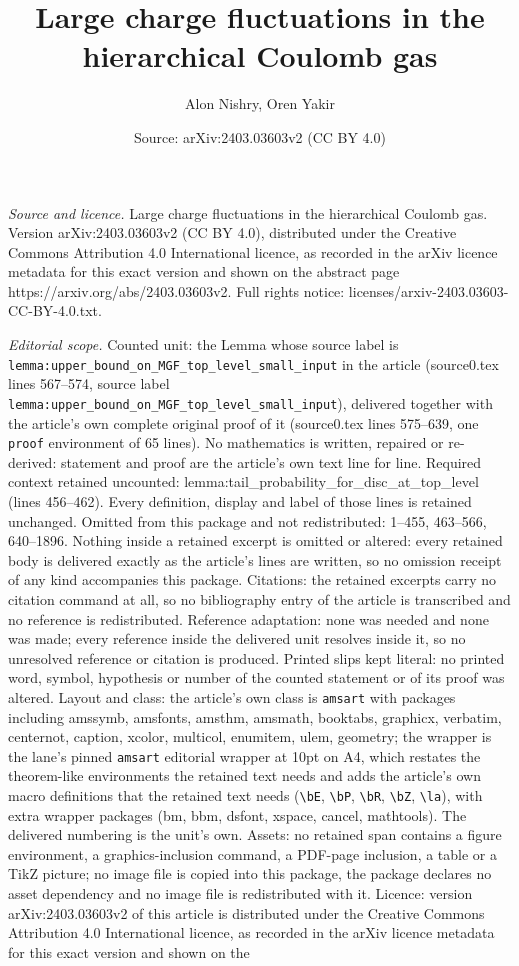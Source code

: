 \documentclass[10pt,a4paper]{amsart}
\title[Large charge fluctuations in the hierarchical Coulomb gas]{Large charge fluctuations in the hierarchical Coulomb gas}
\author{Alon Nishry, Oren Yakir}
\date{Source: arXiv:2403.03603v2 (CC BY 4.0)}
\begin{document}
\maketitle

\noindent\emph{Source and licence.} Large charge fluctuations in the hierarchical Coulomb gas. Version arXiv:2403.03603v2 (CC BY 4.0), distributed under the Creative Commons Attribution 4.0 International licence, as recorded in the arXiv licence metadata for this exact version and shown on the abstract page https://arxiv.org/abs/2403.03603v2. Full rights notice: licenses/arxiv-2403.03603-CC-BY-4.0.txt.\par\smallskip

\noindent\textit{Editorial scope.} Counted unit: the Lemma whose source label is \texttt{lemma:upper\_bound\_on\_MGF\_top\_level\_small\_input} in the article (source0.tex lines 567--574, source label \texttt{lemma:upper\_bound\_on\_MGF\_top\_level\_small\_input}), delivered together with the article's own complete original proof of it (source0.tex lines 575--639, one \texttt{proof} environment of 65 lines). No mathematics is written, repaired or re-derived: statement and proof are the article's own text line for line. Required context retained uncounted: lemma:tail\_probability\_for\_disc\_at\_top\_level (lines 456--462). Every definition, display and label of those lines is retained unchanged. Omitted from this package and not redistributed: 1--455, 463--566, 640--1896. Nothing inside a retained excerpt is omitted or altered: every retained body is delivered exactly as the article's lines are written, so no omission receipt of any kind accompanies this package. Citations: the retained excerpts carry no citation command at all, so no bibliography entry of the article is transcribed and no reference is redistributed. Reference adaptation: none was needed and none was made; every reference inside the delivered unit resolves inside it, so no unresolved reference or citation is produced. Printed slips kept literal: no printed word, symbol, hypothesis or number of the counted statement or of its proof was altered. Layout and class: the article's own class is \texttt{amsart} with packages including amssymb, amsfonts, amsthm, amsmath, booktabs, graphicx, verbatim, centernot, caption, xcolor, multicol, enumitem, ulem, geometry; the wrapper is the lane's pinned \texttt{amsart} editorial wrapper at 10pt on A4, which restates the theorem-like environments the retained text needs and adds the article's own macro definitions that the retained text needs (\texttt{\textbackslash bE}, \texttt{\textbackslash bP}, \texttt{\textbackslash bR}, \texttt{\textbackslash bZ}, \texttt{\textbackslash la}), with extra wrapper packages (bm, bbm, dsfont, xspace, cancel, mathtools). The delivered numbering is the unit's own. Assets: no retained span contains a figure environment, a graphics-inclusion command, a PDF-page inclusion, a table or a TikZ picture; no image file is copied into this package, the package declares no asset dependency and no image file is redistributed with it. Licence: version arXiv:2403.03603v2 of this article is distributed under the Creative Commons Attribution 4.0 International licence, as recorded in the arXiv licence metadata for this exact version and shown on the 
\end{document}
